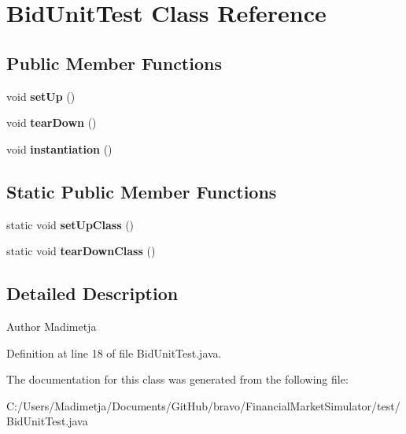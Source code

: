 \hypertarget{class_bid_unit_test}{\section{Bid\+Unit\+Test Class Reference}
\label{class_bid_unit_test}
}
\subsection*{Public Member Functions}
\begin{DoxyCompactItemize}
\item 
\hypertarget{class_bid_unit_test_a17ac735be171e68824a4ab6aee2427c6}{void {\bfseries set\+Up} ()}\label{class_bid_unit_test_a17ac735be171e68824a4ab6aee2427c6}

\item 
\hypertarget{class_bid_unit_test_a1e3ac3daf16cfb03129bc9c6ec29004c}{void {\bfseries tear\+Down} ()}\label{class_bid_unit_test_a1e3ac3daf16cfb03129bc9c6ec29004c}

\item 
\hypertarget{class_bid_unit_test_a00b30251528b2203d6d9f17c321bc499}{void {\bfseries instantiation} ()}\label{class_bid_unit_test_a00b30251528b2203d6d9f17c321bc499}

\end{DoxyCompactItemize}
\subsection*{Static Public Member Functions}
\begin{DoxyCompactItemize}
\item 
\hypertarget{class_bid_unit_test_a708398bb9f31d775f2a8cadfa7de00ad}{static void {\bfseries set\+Up\+Class} ()}\label{class_bid_unit_test_a708398bb9f31d775f2a8cadfa7de00ad}

\item 
\hypertarget{class_bid_unit_test_a63ef12d1e873a8b1dd37a8d1009a2a2f}{static void {\bfseries tear\+Down\+Class} ()}\label{class_bid_unit_test_a63ef12d1e873a8b1dd37a8d1009a2a2f}

\end{DoxyCompactItemize}


\subsection{Detailed Description}
\begin{DoxyAuthor}{Author}
Madimetja 
\end{DoxyAuthor}


Definition at line 18 of file Bid\+Unit\+Test.\+java.



The documentation for this class was generated from the following file\+:\begin{DoxyCompactItemize}
\item 
C\+:/\+Users/\+Madimetja/\+Documents/\+Git\+Hub/bravo/\+Financial\+Market\+Simulator/test/Bid\+Unit\+Test.\+java\end{DoxyCompactItemize}
